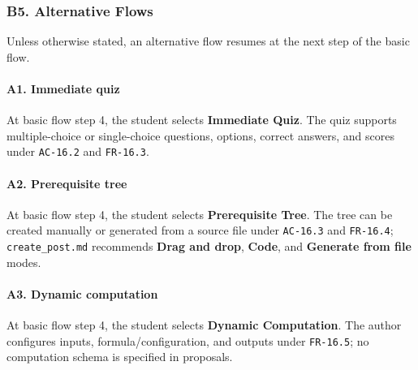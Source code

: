 \documentclass[12pt]{article}
\begin{document}
\hypertarget{sec:b5-alternative-flows}{}
\subsubsection*{B5. Alternative Flows}
\par\medskip

Unless otherwise stated, an alternative flow resumes at the next step of the basic flow.
\par\medskip

\hypertarget{sec:a1-immediate-quiz}{}
\paragraph*{A1. Immediate quiz}
\par\medskip

At basic flow step 4, the student selects \textbf{Immediate Quiz}. The quiz supports multiple-choice or single-choice questions, options, correct answers, and scores under \texttt{AC-16.2} and \texttt{FR-16.3}.
\par\medskip

\hypertarget{sec:a2-prerequisite-tree}{}
\paragraph*{A2. Prerequisite tree}
\par\medskip

At basic flow step 4, the student selects \textbf{Prerequisite Tree}. The tree can be created manually or generated from a source file under \texttt{AC-16.3} and \texttt{FR-16.4}; \texttt{create\_post.md} recommends \textbf{Drag and drop}, \textbf{Code}, and \textbf{Generate from file} modes.
\par\medskip

\hypertarget{sec:a3-dynamic-computation}{}
\paragraph*{A3. Dynamic computation}
\par\medskip

At basic flow step 4, the student selects \textbf{Dynamic Computation}. The author configures inputs, formula/configuration, and outputs under \texttt{FR-16.5}; no computation schema is specified in proposals.
\par\medskip

\hypertarget{sec:a4-cancel-creation}{}
\end{document}
